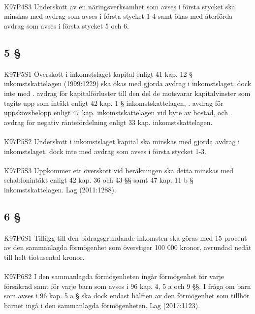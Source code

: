 \documentclass[a4paper,notitlepage,openany,10pt]{book}
\begin{document}
\paragraph*{}
{\tiny K97P4S3}
Underskott av en näringsverksamhet som avses i första stycket ska minskas med avdrag som avses i första stycket 1-4 samt ökas med återförda avdrag som avses i första stycket 5 och 6.
\subsection*{5 §}
\paragraph*{}
{\tiny K97P5S1}
Överskott i inkomstslaget kapital enligt 41 kap. 12 § inkomstskattelagen (1999:1229) ska ökas med gjorda avdrag i inkomstslaget, dock inte med
. avdrag för kapitalförluster till den del de motsvarar kapitalvinster som tagits upp som intäkt enligt 42 kap. 1 § inkomstskattelagen,
. avdrag för uppskovsbelopp enligt 47 kap. inkomstskattelagen vid byte av bostad, och
. avdrag för negativ räntefördelning enligt 33 kap.
inkomstskattelagen.
\paragraph*{}
{\tiny K97P5S2}
Underskott i inkomstslaget kapital ska minskas med gjorda avdrag i inkomstslaget, dock inte med avdrag som avses i första stycket 1-3.
\paragraph*{}
{\tiny K97P5S3}
Uppkommer ett överskott vid beräkningen ska detta minskas med schablonintäkt enligt 42 kap. 36 och 43 §§ samt 47 kap. 11 b § inkomstskattelagen.
Lag (2011:1288).
\subsection*{6 §}
\paragraph*{}
{\tiny K97P6S1}
Tillägg till den bidragsgrundande inkomsten ska göras med 15 procent av den sammanlagda förmögenhet som överstiger 100 000 kronor, avrundad nedåt till helt tiotusental kronor.
\paragraph*{}
{\tiny K97P6S2}
I den sammanlagda förmögenheten ingår förmögenhet för varje försäkrad samt för varje barn som avses i 96 kap. 4, 5 a och 9 §§. I fråga om barn som avses i 96 kap. 5 a § ska dock endast hälften av den förmögenhet som tillhör barnet ingå i den sammanlagda förmögenheten.
Lag (2017:1123).
\end{document}
